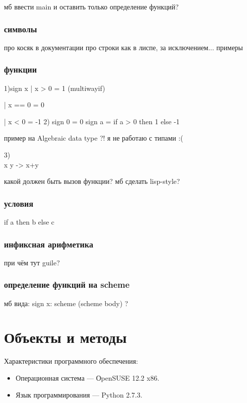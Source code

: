 \documentclass[12pt,a4paper,oneside]{extarticle}
\begin{document}
        мб ввести main и оставить только определение функций?

        \subsubsection{символы}
            про косяк в документации про строки
            как в лиспе, за исключением... 
            примеры
        \subsubsection{функции}
            1)sign x  | x > 0  = 1 (multiwayif)

                | x == 0 = 0

                | x < 0  = -1
            2) sign 0 = 0 
            sign a = if a > 0 then 1 else -1

            пример на Algebraic data type ?! я не работаю с типами :(

            3) \\x y -> x+y 

            какой должен быть вызов функции? мб сделать lisp-style?
        \subsubsection{условия}
            if a then b else c

        \subsubsection{инфиксная арифметика}
            при чём тут guile?
        \subsubsection{определение функций на scheme}
            мб вида: sign x: scheme (scheme body) ?

        
\clearpage

\section{Объекты и методы}
\label{sec:configuration} 
        \noindent Характеристики программного обеспечения:
        \begin{itemize}
            \item Операционная система --- ОpenSUSE 12.2 x86.
            \item Язык программирования --- Python 2.7.3.
        \end{itemize}
        
\end{document}
